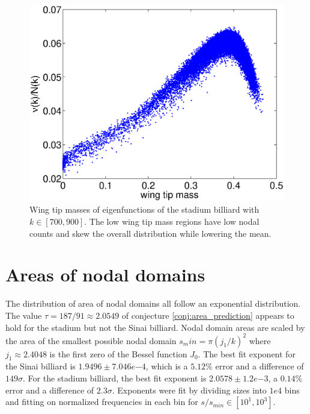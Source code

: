 \documentclass{report}
\begin{document}
\begin{figure}
  \begin{center}
    \includegraphics[width=\textwidth]{figs/results/qust_700_to_900_wtms.eps}
    \caption{Wing tip masses of eigenfunctions of the stadium billiard with $k \in [700, 900]$. The low wing tip mass regions have low nodal counts and skew the overall distribution while lowering the mean.}
    \label{fig:wtms}
  \end{center}
\end{figure}

\section{Areas of nodal domains}
The distribution of area of nodal domains all follow an exponential distribution. The value $\tau = 187/91 \approx 2.0549$ of conjecture \ref{conj:area_prediction} appears to hold for the stadium but not the Sinai billiard. Nodal domain areas are scaled by the area of the smallest possible nodal domain $s_min = \pi (j_{1} / k)^{2}$ where $j_{1} \approx 2.4048$ is the first zero of the Bessel function $J_{0}$. The best fit exponent for the Sinai billiard is $1.9496 \pm 7.046e{-4}$, which is a $5.12\%$ error and a difference of $149 \sigma$. For the stadium billiard, the best fit exponent is $2.0578 \pm 1.2e{-3}$, a $0.14\%$ error and a difference of $2.3 \sigma$. Exponents were fit by dividing sizes into $1e4$ bins and fitting on normalized frequencies in each bin for $s/s_{min} \in [10^{1}, 10^{3}]$.
\end{document}
